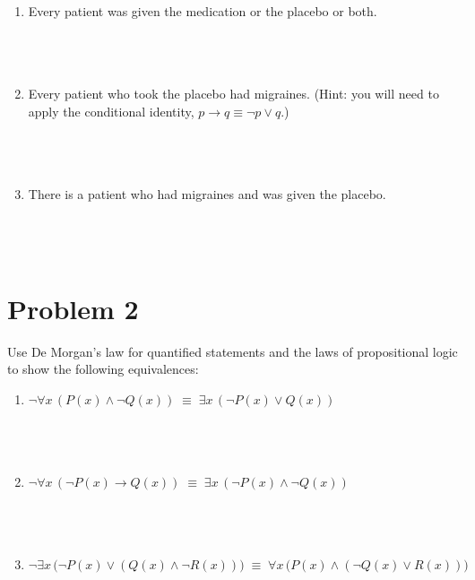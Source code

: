 \documentclass{amsart}
\theoremstyle{definition}
\theoremstyle{Exercise}
\theoremstyle{remark}
\theoremstyle{rule}
\numberwithin{equation}{section}
\begin{document}
\begin{enumerate}[label=(\alph*)]

\item Every patient was given the medication or the placebo or both.\\\\
\\\\

\item Every patient who took the placebo had migraines. (Hint: you will need to apply the conditional identity, $p \to q \equiv \neg p \lor q$.)\\\\
\\\\
\item There is a patient who had migraines and was given the placebo.\\\\
\\\\
\end{enumerate}

\newpage


\section*{Problem 2}

Use De Morgan's law for quantified statements and the laws of propositional logic to show the following equivalences:\\
\begin{enumerate}[label=(\alph*)]
\item $\neg \forall x \, \left(P(x) \land \neg Q(x) \right)\; \equiv \; \exists x \, \left(\neg P(x) \lor  Q(x) \right)$\\\\
\\\\
\item $\neg \forall x \, \left(\neg P(x) \to Q(x) \right)\; \equiv \; \exists x \, \left(\neg P(x) \land  \neg Q(x) \right)$\\\\
\\\\
\item $\neg \exists x \, \big(\neg P(x) \lor \left(Q(x) \land \neg R(x) \right)\big)\; \equiv \; \forall x \,\big( P(x) \land \left( \neg Q(x) \lor R(x) \right)\big)$\\\\
\\\\
\end{enumerate}
\end{document}
